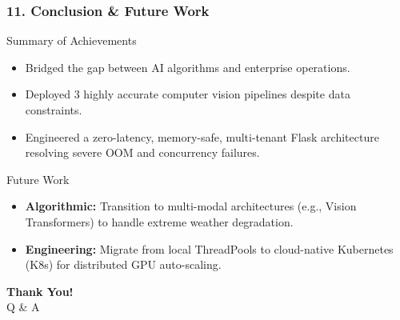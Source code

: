 \documentclass[aspectratio=169]{beamer}
\begin{document}
\begin{frame}
\frametitle{11. Conclusion \& Future Work}
\begin{block}{Summary of Achievements}
\begin{itemize}
    \item Bridged the gap between AI algorithms and enterprise operations.
    \item Deployed 3 highly accurate computer vision pipelines despite data constraints.
    \item Engineered a zero-latency, memory-safe, multi-tenant Flask architecture resolving severe OOM and concurrency failures.
\end{itemize}
\end{block}
\vspace{0.2cm}
\begin{block}{Future Work}
\begin{itemize}
    \item \textbf{Algorithmic:} Transition to multi-modal architectures (e.g., Vision Transformers) to handle extreme weather degradation.
    \item \textbf{Engineering:} Migrate from local ThreadPools to cloud-native Kubernetes (K8s) for distributed GPU auto-scaling.
\end{itemize}
\end{block}
\end{frame}

\begin{frame}
\centering
\Huge \textbf{Thank You!}\\
\vspace{0.5cm}
\Large Q \& A
\end{frame}
\end{document}
